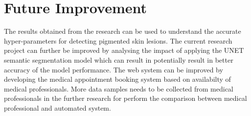 \section{Future Improvement}
The results obtained from the research can be used to understand the accurate hyper-parameters for detecting pigmented skin lesions. 
The current research project can further be improved by analysing the impact of applying the UNET semantic segmentation model which can result in potentially result in better accuracy of the model performance.
The web system can be improved by developing the medical appointment booking system based on availabilty of medical professionals. More data samples needs to be collected from medical professionals
in the further research for perform the comparison between medical professional and automated system.
